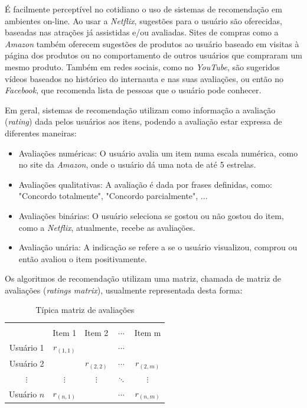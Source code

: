 \documentclass[12pt,a4paper,header]{abnt}
\begin{document}
É facilmente perceptível no cotidiano o uso de sistemas de recomendação em ambientes on-line. Ao usar a \textit{Netflix}, sugestões para o usuário são oferecidas, baseadas nas atrações já assistidas e/ou avaliadas. Sites de compras como a \textit{Amazon} também oferecem sugestões de produtos ao usuário baseado em visitas à página dos produtos ou no comportamento de outros usuários que compraram um mesmo produto. Também em redes sociais, como no \textit{YouTube}, são sugeridos vídeos baseados no histórico do internauta e nas suas avaliações, ou então no \textit{Facebook}, que recomenda lista de pessoas que o usuário pode conhecer\cite{gorakala2015building}.

Em geral, sistemas de recomendação utilizam como informação a avaliação (\textit{rating}) dada pelos usuários aos itens, podendo a avaliação estar expressa de diferentes maneiras\cite{shapira2011recommender}:

\begin{itemize}

\item Avaliações numéricas: O usuário avalia um item numa escala numérica, como no site da \textit{Amazon}, onde o usuário dá uma nota de até 5 estrelas.

\item Avaliações qualitativas: A avaliação é dada por frases definidas, como: "Concordo totalmente", "Concordo parcialmente", ...

\item Avaliações binárias: O usuário seleciona se gostou ou não gostou do item, como a \textit{Netflix}, atualmente, recebe as avaliações.

\item Avaliação unária: A indicação se refere a se o usuário visualizou, comprou ou então avaliou o item positivamente.

\end{itemize}

Os algoritmos de recomendação utilizam uma matriz, chamada de matriz de avaliações (\textit{ratings matrix}), usualmente representada desta forma:

\begin{table}[!h]
\centering
\caption{Típica matriz de avaliações}
\label{rating_matrix}
\begin{tabular}{c|c|c|c|c}
\hline \\
            & Item 1      & Item 2      & $\cdots$ & Item m      \\
Usuário 1   & $r_{(1, 1)}$ &             & $\cdots$  &             \\
Usuário 2   &  & $r_{(2, 2)}$ & $\cdots$ & $r_{(2, m)}$ \\
$\vdots$       &    $\vdots$  & $\vdots$       &  $\ddots$ & $\vdots$ \\
Usuário $n$ & $r_{(n, 1)}$ &             & $\cdots$ & $r_{(n, m)}$ \\
\hline
\end{tabular}
\end{table}
\end{document}
